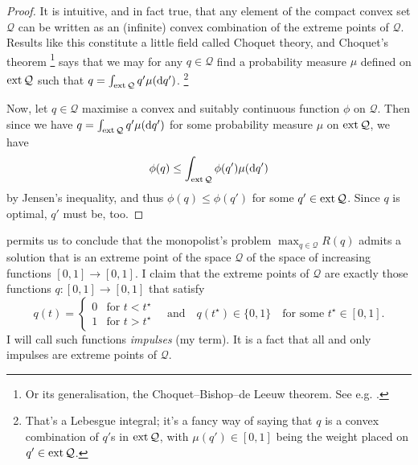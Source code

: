 \begin{proof}
	It is intuitive, and in fact true, that any element of the compact convex set $\mathcal{Q}$ can be written as an (infinite) convex combination of the extreme points of $\mathcal{Q}$.
	Results like this constitute a little field called Choquet theory,
	and Choquet's theorem%
		\footnote{Or its generalisation, the Choquet--Bishop--de Leeuw theorem. See e.g. \textcite{Phelps2001}.}
	says that
	we may for any $q \in \mathcal{Q}$ find a probability measure $\mu$ defined on $\operatorname*{ext} \mathcal{Q}$ such that $q = \int_{\operatorname*{ext} \mathcal{Q}} q' \mu(\mathrm{d} q')$.%
		\footnote{That's a Lebesgue integral;
		it's a fancy way of saying that $q$ is a convex combination of $q'$s in $\operatorname*{ext} \mathcal{Q}$, with $\mu(q') \in [0,1]$ being the weight placed on $q' \in \operatorname*{ext} \mathcal{Q}$.}

	Now, let $q \in \mathcal{Q}$ maximise a convex and suitably continuous function $\phi$ on $\mathcal{Q}$.
	Then since we have $q = \int_{\operatorname*{ext} \mathcal{Q}} q' \mu(\mathrm{d} q')$ for some probability measure $\mu$ on $\operatorname*{ext} \mathcal{Q}$, we have
	\begin{equation*}
		\phi(q) \leq \int_{\operatorname*{ext} \mathcal{Q}} \phi(q') \mu(\mathrm{d} q') 
	\end{equation*}
	by Jensen's inequality,
	and thus $\phi(q) \leq \phi(q')$ for some $q' \in \operatorname*{ext} \mathcal{Q}$.
	Since $q$ is optimal, $q'$ must be, too.
\end{proof}


 permits us to conclude that the monopolist's problem $\max_{q \in \mathcal{Q}} R(q)$
admits a solution that is an extreme point of the space $\mathcal{Q}$ of the space of increasing functions $[0,1] \to [0,1]$.
I claim that the extreme points of $\mathcal{Q}$
are exactly those functions
 $q : [0,1] \to [0,1]$
that satisfy
%
\begin{equation*}
	q(t) =
	\begin{cases}
		0	& \text{for $t<t^\star$} \\
		1	& \text{for $t>t^\star$} 
	\end{cases}
	\quad \text{and} \quad q(t^\star) \in \{0,1\}
	\quad
	\text{for some $t^\star \in [0,1]$.}
\end{equation*}
%
I will call such functions \emph{impulses} (my term).
It is a fact that all and only impulses are extreme points of $\mathcal{Q}$.

